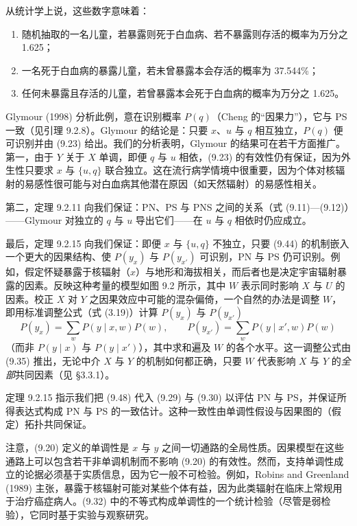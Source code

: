 从统计学上说，这些数字意味着：

\begin{enumerate}[label=\arabic*.,leftmargin=1.8em]
\item 随机抽取的一名儿童，若暴露则死于白血病、若不暴露则存活的概率为万分之 1.625；
\item 一名死于白血病的暴露儿童，若未曾暴露本会存活的概率为 37.544\%；
\item 任何未暴露且存活的儿童，若曾暴露本会死于白血病的概率为万分之 1.625。
\end{enumerate}

Glymour (1998) 分析此例，意在识别概率 $P(q)$（Cheng 的“因果力”），它与 PS 一致（见引理 9.2.8）。Glymour 的结论是：只要 $x$、$u$ 与 $q$ 相互独立，$P(q)$ 便可识别并由 \textup{(9.23)} 给出。我们的分析表明，Glymour 的结果可在若干方面推广。第一，由于 $Y$ 关于 $X$ 单调，即便 $q$ 与 $u$ 相依，\textup{(9.23)} 的有效性仍有保证，因为外生性只要求 $x$ 与 $\{u,q\}$ 联合独立。这在流行病学情境中很重要，因为个体对核辐射的易感性很可能与对白血病其他潜在原因（如天然辐射）的易感性相关。

第二，定理 9.2.11 向我们保证：PN、PS 与 PNS 之间的关系（式 \textup{(9.11)}—\textup{(9.12)}）——Glymour 对独立的 $q$ 与 $u$ 导出它们——在 $u$ 与 $q$ 相依时仍应成立。

最后，定理 9.2.15 向我们保证：即便 $x$ 与 $\{u,q\}$ 不独立，只要 \textup{(9.44)} 的机制嵌入一个更大的因果结构、使 $P(y_x)$ 与 $P(y_{x'})$ 可识别，PN 与 PS 仍可识别。例如，假定怀疑暴露于核辐射（$x$）与地形和海拔相关，而后者也是决定宇宙辐射暴露的因素。反映这种考量的模型如图 9.2 所示，其中 $W$ 表示同时影响 $X$ 与 $U$ 的因素。校正 $X$ 对 $Y$ 之因果效应中可能的混杂偏倚，一个自然的办法是调整 $W$，即用标准调整公式（式 \textup{(3.19)}）计算 $P(y_x)$ 与 $P(y_{x'})$
\begin{equation}
P(y_x)=\sum_w P(y\mid x,w)P(w),\qquad P(y_{x'})=\sum_w P(y\mid x',w)P(w) \tag{9.48}
\end{equation}
（而非 $P(y\mid x)$ 与 $P(y\mid x')$），其中求和遍及 $W$ 的各个水平。这一调整公式由 \textup{(9.35)} 推出，无论中介 $X$ 与 $Y$ 的机制如何都正确，只要 $W$ 代表影响 $X$ 与 $Y$ 的\emph{全部}共同因素（见 \S 3.3.1）。

定理 9.2.15 指示我们把 \textup{(9.48)} 代入 \textup{(9.29)} 与 \textup{(9.30)} 以评估 PN 与 PS，并保证所得表达式构成 PN 与 PS 的一致估计。这种一致性由单调性假设与因果图的（假定）拓扑共同保证。

注意，\textup{(9.20)} 定义的单调性是 $x$ 与 $y$ 之间一切通路的全局性质。因果模型在这些通路上可以包含若干非单调机制而不影响 \textup{(9.20)} 的有效性。然而，支持单调性成立的论据必须基于实质信息，因为它一般不可检验。例如，Robins and Greenland (1989) 主张，暴露于核辐射可能对某些个体有益，因为此类辐射在临床上常规用于治疗癌症病人。\textup{(9.32)} 中的不等式构成单调性的一个统计检验（尽管是弱检验），它同时基于实验与观察研究。

